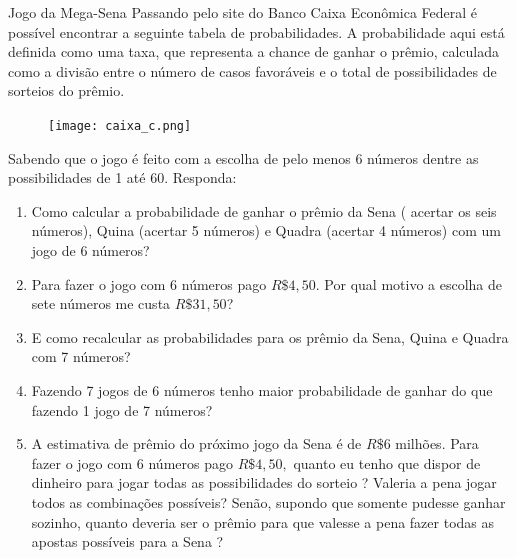 \begin{task}{Jogo da Mega-Sena}
Passando pelo site do Banco Caixa Econômica Federal é possível encontrar a seguinte tabela de probabilidades. A probabilidade aqui está definida como uma taxa, que representa a chance de ganhar o prêmio, calculada como a divisão entre o número de casos favoráveis e o total de possibilidades de sorteios do prêmio.  
  

\begin{figure}[H]
\centering

\texttt{[image: caixa\_c.png]}
\end{figure}


Sabendo que o jogo é feito com a escolha de pelo menos 6 números dentre as possibilidades de 1 até 60. Responda:

 \begin{enumerate}
     \item Como calcular a probabilidade de ganhar o prêmio da Sena ( acertar os seis números), Quina (acertar 5 números) e Quadra (acertar 4 números) com um jogo de 6 números?
     \item Para fazer o jogo com 6 números pago $R\$4,50$. Por qual motivo a escolha de sete números me custa  $R\$31,50$?
     \item E como recalcular as probabilidades para os prêmio da Sena, Quina e Quadra com 7 números?
     \item Fazendo 7 jogos de 6 números tenho maior probabilidade de ganhar do que fazendo 1 jogo de 7 números?
     \item A estimativa de prêmio do próximo jogo da Sena é de $R\$ 6$ milhões. Para fazer o jogo com 6 números pago $R\$4,50,$ quanto eu tenho que dispor de dinheiro para jogar todas as possibilidades do sorteio ? Valeria a pena jogar todos as combinações possíveis? Senão, supondo que somente pudesse ganhar sozinho, quanto deveria ser o prêmio para que valesse a pena fazer todas as apostas possíveis para a Sena ?
\end{enumerate}
\end{task}
\clearpage

